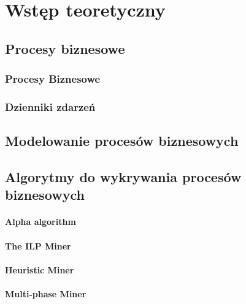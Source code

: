 \chapter{Wstęp teoretyczny}
\label{cha:wstepTeoretyczny}


\section{Procesy biznesowe}
\label{sec:procesyBiznesowe}
\subsection{Procesy Biznesowe}
\subsection{Dzienniki zdarzeń}


\section{Modelowanie procesów biznesowych}
\label{sec:modelowanie}


\section{Algorytmy do wykrywania procesów biznesowych}
\label{sec:algorytmy}
\subsubsection{Alpha algorithm}
\subsubsection{The ILP Miner}
\subsubsection{Heuristic Miner}
\subsubsection{Multi-phase Miner}


